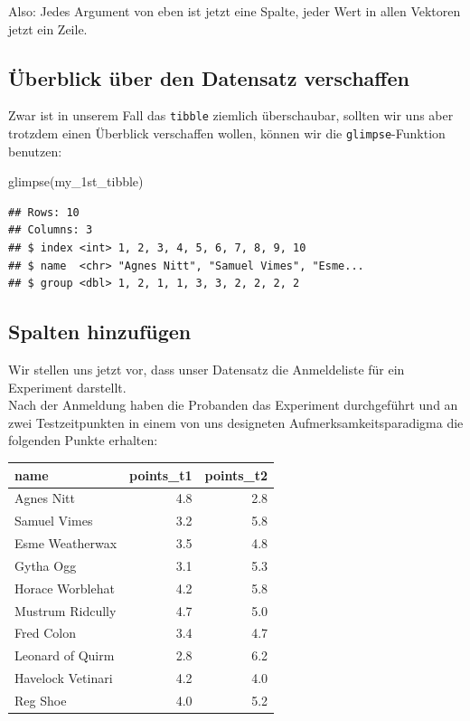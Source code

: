 \documentclass[
]{book}
\newenvironment{Shaded}{\begin{snugshade}}{\end{snugshade}}
\newcommand{\FunctionTok}[1]{\textcolor[rgb]{0.00,0.00,0.00}{#1}}
\newcommand{\NormalTok}[1]{#1}
\begin{document}
Also: Jedes Argument von eben ist jetzt eine Spalte, jeder Wert in allen Vektoren jetzt ein Zeile.

\hypertarget{uxfcberblick-uxfcber-den-datensatz-verschaffen}{%
\subsection{Überblick über den Datensatz verschaffen}\label{uxfcberblick-uxfcber-den-datensatz-verschaffen}}

Zwar ist in unserem Fall das \texttt{tibble} ziemlich überschaubar, sollten wir uns aber trotzdem einen Überblick verschaffen wollen, können wir die \texttt{glimpse}-Funktion benutzen:

\begin{Shaded}
\begin{Highlighting}[]
\FunctionTok{glimpse}\NormalTok{(my\_1st\_tibble)}
\end{Highlighting}
\end{Shaded}

\begin{verbatim}
## Rows: 10
## Columns: 3
## $ index <int> 1, 2, 3, 4, 5, 6, 7, 8, 9, 10
## $ name  <chr> "Agnes Nitt", "Samuel Vimes", "Esme...
## $ group <dbl> 1, 2, 1, 1, 3, 3, 2, 2, 2, 2
\end{verbatim}

\hypertarget{spalten-hinzufuxfcgen}{%
\subsection{Spalten hinzufügen}\label{spalten-hinzufuxfcgen}}

Wir stellen uns jetzt vor, dass unser Datensatz die Anmeldeliste für ein Experiment darstellt.\\
Nach der Anmeldung haben die Probanden das Experiment durchgeführt und an zwei Testzeitpunkten in einem von uns designeten Aufmerksamkeitsparadigma die folgenden Punkte erhalten:

\begin{table}[H]
\centering
\begin{tabular}[t]{l|r|r}
\hline
name & points\_t1 & points\_t2\\
\hline
Agnes Nitt & 4.8 & 2.8\\
\hline
Samuel Vimes & 3.2 & 5.8\\
\hline
Esme Weatherwax & 3.5 & 4.8\\
\hline
Gytha Ogg & 3.1 & 5.3\\
\hline
Horace Worblehat & 4.2 & 5.8\\
\hline
Mustrum Ridcully & 4.7 & 5.0\\
\hline
Fred Colon & 3.4 & 4.7\\
\hline
Leonard of Quirm & 2.8 & 6.2\\
\hline
Havelock Vetinari & 4.2 & 4.0\\
\hline
Reg Shoe & 4.0 & 5.2\\
\hline
\end{tabular}
\end{table}
\end{document}
